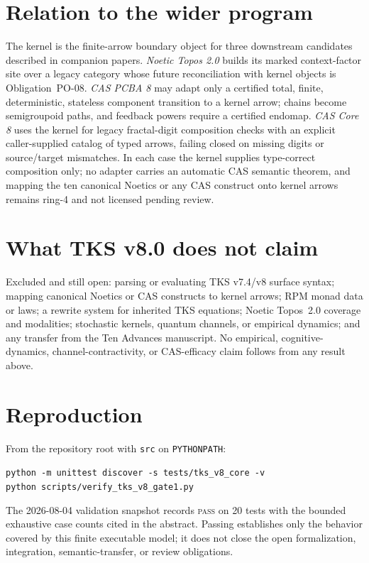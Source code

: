 \documentclass[11pt]{amsart}
\theoremstyle{definition}
\theoremstyle{remark}
\begin{document}
\section{Relation to the wider program}

The kernel is the finite-arrow boundary object for three downstream candidates described in companion papers. \emph{Noetic Topos 2.0} builds its marked context-factor site over a legacy category whose future reconciliation with kernel objects is Obligation~PO-08. \emph{CAS PCBA 8} may adapt only a certified total, finite, deterministic, stateless component transition to a kernel arrow; chains become semigroupoid paths, and feedback powers require a certified endomap. \emph{CAS Core 8} uses the kernel for legacy fractal-digit composition checks with an explicit caller-supplied catalog of typed arrows, failing closed on missing digits or source/target mismatches. In each case the kernel supplies type-correct composition only; no adapter carries an automatic CAS semantic theorem, and mapping the ten canonical Noetics or any CAS construct onto kernel arrows remains ring-4 and not licensed pending review.

\section{What TKS v8.0 does not claim}

Excluded and still open: parsing or evaluating TKS v7.4/v8 surface syntax; mapping canonical Noetics or CAS constructs to kernel arrows; RPM monad data or laws; a rewrite system for inherited TKS equations; Noetic Topos~2.0 coverage and modalities; stochastic kernels, quantum channels, or empirical dynamics; and any transfer from the Ten Advances manuscript. No empirical, cognitive-dynamics, channel-contractivity, or CAS-efficacy claim follows from any result above.

\section{Reproduction}

From the repository root with \texttt{src} on \texttt{PYTHONPATH}:
\begin{center}
\texttt{python -m unittest discover -s tests/tks\_v8\_core -v}\\
\texttt{python scripts/verify\_tks\_v8\_gate1.py}
\end{center}
The 2026-08-04 validation snapshot records \textsc{pass} on 20 tests with the bounded exhaustive case counts cited in the abstract. Passing establishes only the behavior covered by this finite executable model; it does not close the open formalization, integration, semantic-transfer, or review obligations.
\end{document}
